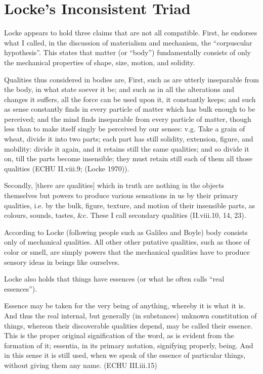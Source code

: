 \documentclass[12pt]{article}
\makeatletter
\newcommand{\citeprocitem}[2]{\hyper@linkstart{cite}{citeproc_bib_item_#1}#2\hyper@linkend}
\makeatother
\begin{document}
\section{Locke's Inconsistent Triad}
\label{sec:org75de4cc}

Locke appears to hold three claims that are not all compatible. First, he endorses
what I called, in the discussion of materialism and mechanism, the ``corpuscular
hypothesis''. This states that matter (or ``body'') fundamentally consists of only the
mechanical properties of shape, size, motion, and solidity.

\begin{quote-b}
Qualities thus considered in bodies are, First, such as are utterly inseparable from
the body, in what state soever it be; and such as in all the alterations and changes
it suffers, all the force can be used upon it, it constantly keeps; and such as sense
constantly finds in every particle of matter which has bulk enough to be perceived;
and the mind finds inseparable from every particle of matter, though less than to
make itself singly be perceived by our senses: v.g. Take a grain of wheat, divide it
into two parts; each part has still solidity, extension, figure, and mobility: divide
it again, and it retains still the same qualities; and so divide it on, till the
parts become insensible; they must retain still each of them all those qualities
(ECHU II.viii.9; (\citeprocitem{6}{Locke 1970})).
\end{quote-b}

\begin{quote-b}
Secondly, [there are qualities] which in truth are nothing in the objects themselves
but powers to produce various sensations in us by their primary qualities, i.e. by
the bulk, figure, texture, and motion of their insensible parts, as colours, sounds,
tastes, \&c. These I call secondary qualities (II.viii.10, 14, 23).
\end{quote-b}

According to Locke (following people such as Galileo and Boyle) body consists only of
mechanical qualities. All other other putative qualities, such as those of color or
smell, are simply powers that the mechanical qualities have to produce sensory ideas
in beings like ourselves.

Locke also holds that things have essences (or what he often calls ``real essences'').

\begin{quote-b}
Essence may be taken for the very being of anything, whereby it is what it is. And
thus the real internal, but generally (in substances) unknown constitution of things,
whereon their discoverable qualities depend, may be called their essence. This is the
proper original signification of the word, as is evident from the formation of it;
essentia, in its primary notation, signifying properly, being. And in this sense it
is still used, when we speak of the essence of particular things, without giving them
any name. (ECHU III.iii.15)
\end{quote-b}
\end{document}

